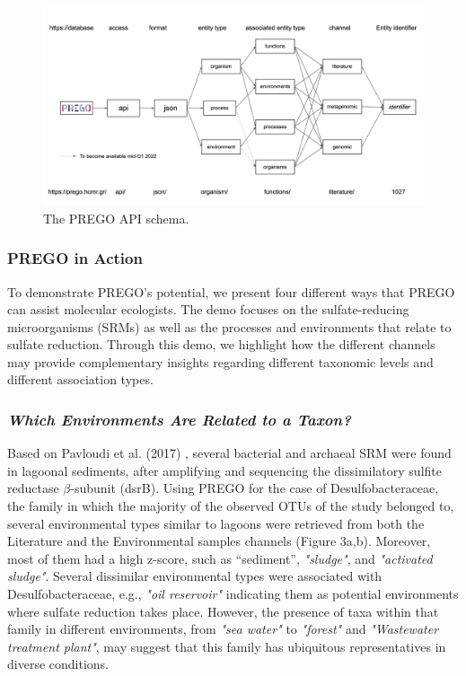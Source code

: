    \begin{figure}[h]
      \centering
      \includegraphics[width=135mm]{figures/figure_4_PREGO API.png}
      \caption[The PREGO API schema]{The PREGO API schema.}
      \label{fig:prego_api_schema}
   \end{figure}


   \subsubsection*{PREGO in Action}
   \label{subsec:prego-action}

   To demonstrate PREGO's potential, we present four different ways that PREGO can assist molecular ecologists. 
   The demo focuses on the sulfate-reducing microorganisms (SRMs) as well as the processes and environments that relate to sulfate reduction. 
   Through this demo, we highlight how the different channels may provide complementary insights regarding different taxonomic levels and different association types.

   \subsubsection*{\textit{Which Environments Are Related to a Taxon?}}
   \label{subsec:envo-taxa}

   Based on Pavloudi et al. (2017) \citep{pavloudi2017diversity}, several bacterial and archaeal SRM were found in lagoonal sediments, after amplifying and sequencing the dissimilatory sulfite reductase $\beta$-subunit (dsrB). 
   Using PREGO for the case of Desulfobacteraceae, the family in which the majority of the observed OTUs of the study belonged to, several environmental types similar to lagoons were retrieved from both the Literature and the Environmental samples channels (Figure 3a,b). Moreover, most of them had a high z-score, such as “sediment”, \textit{"sludge"}, and \textit{"activated sludge"}. 
   Several dissimilar environmental types were associated with Desulfobacteraceae, e.g., \textit{"oil reservoir"} indicating them as potential environments where sulfate reduction takes place. 
   However, the presence of taxa within that family in different environments, from \textit{"sea water"} to \textit{"forest"} and \textit{"Wastewater treatment plant"}, may suggest that this family has ubiquitous representatives in diverse conditions.

